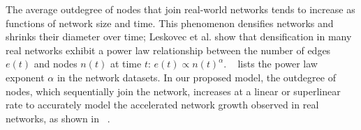 
The average outdegree of nodes that join real-world networks tends to increase
as functions of network size and time. This phenomenon densifies networks and shrinks their
diameter over time; Leskovec et al. \cite{leskovec2005graphs} show that
densification in many real networks exhibit a power law relationship between the
number of edges $e(t)$ and nodes $n(t)$ at time $t$: $e(t) \propto
n(t)^{\alpha}$. ~ lists the power law exponent $\alpha$ in
the network datasets. In our proposed model, the outdegree of nodes, which
sequentially join the network, increases at a linear or superlinear rate to accurately
model the accelerated network growth observed in real networks, as shown in ~.

